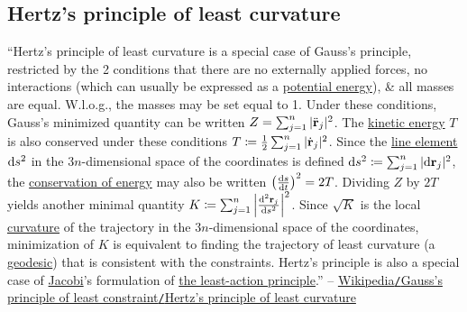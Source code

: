 \documentclass[oneside]{book}
\numberwithin{equation}{section}
\begin{document}
\subsection{Hertz's principle of least curvature}
``Hertz's principle of least curvature is a special case of Gauss's principle, restricted by the 2 conditions that there are no externally applied forces, no interactions (which can usually be expressed as a \href{https://en.wikipedia.org/wiki/Potential_energy}{potential energy}), \& all masses are equal. W.l.o.g., the masses may be set equal to 1. Under these conditions, Gauss's minimized quantity can be written $Z = \sum_{j=1}^n |\ddot{\bf r}_j|^2$. The \href{https://en.wikipedia.org/wiki/Kinetic_energy}{kinetic energy} $T$ is also conserved under these conditions $T\coloneqq\frac{1}{2}\sum_{j=1}^n |\dot{\bf r}_j|^2$. Since the \href{https://en.wikipedia.org/wiki/Line_element}{line element} ${\rm d}s^2$ in the $3n$-dimensional space of the coordinates is defined ${\rm d}s^2\coloneqq\sum_{j=1}^n |{\rm d}{\bf r}_j|^2$, the \href{https://en.wikipedia.org/wiki/Conservation_of_energy}{conservation of energy} may also be written $\left(\frac{{\rm d}s}{{\rm d}t}\right)^2 = 2T$. Dividing $Z$ by $2T$ yields another minimal quantity $K\coloneqq\sum_{j=1}^n \left|\frac{{\rm d}^2{\bf r}_j}{{\rm d}s^2}\right|^2$. Since $\sqrt{K}$ is the local \href{https://en.wikipedia.org/wiki/Curvature}{curvature} of the trajectory in the $3n$-dimensional space of the coordinates, minimization of $K$ is equivalent to finding the trajectory of least curvature (a \href{https://en.wikipedia.org/wiki/Geodesic}{geodesic}) that is consistent with the constraints. Hertz's principle is also a special case of \href{https://en.wikipedia.org/wiki/Carl_Gustav_Jakob_Jacobi}{Jacobi}'s formulation of \href{https://en.wikipedia.org/wiki/Maupertuis%27_principle}{the least-action principle}.'' -- \href{https://en.wikipedia.org/wiki/Gauss%27s_principle_of_least_constraint#Hertz's_principle_of_least_curvature}{Wikipedia\texttt{/}Gauss's principle of least constraint\texttt{/}Hertz's principle of least curvature}

\end{document}
